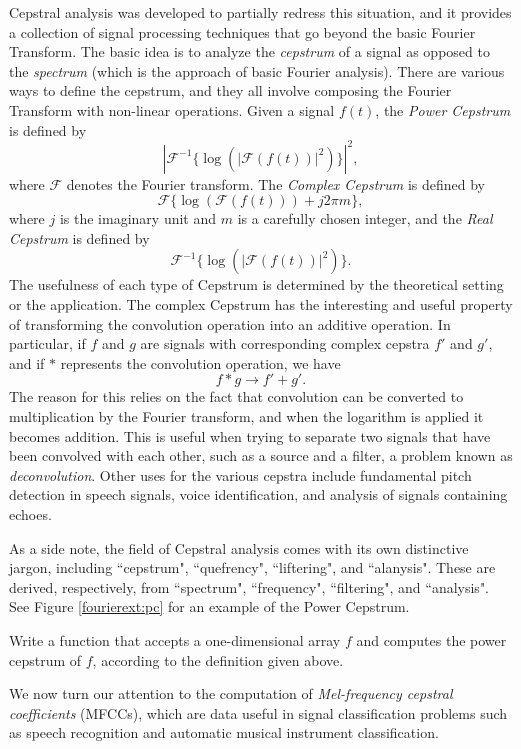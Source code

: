 Cepstral analysis was developed to partially redress this situation, and it provides a collection of signal 
processing techniques that go beyond the basic Fourier Transform. The basic idea is to analyze the
\emph{cepstrum} of a signal as opposed to the \emph{spectrum} (which is the approach of basic Fourier
analysis). There are various ways to define the cepstrum, and they all involve composing the Fourier
Transform with non-linear operations. Given a signal $f(t)$, the \emph{Power Cepstrum} is defined by
$$
\left|\mathcal{F}^{-1}\{\log(|\mathcal{F}(f(t))|^2)\}\right|^2,
$$
where $\mathcal{F}$ denotes the Fourier transform. The \emph{Complex Cepstrum} is defined by
$$
\mathcal{F}\{\log(\mathcal{F}(f(t)))+j2\pi m\},
$$
where $j$ is the imaginary unit and $m$ is a carefully chosen integer, and the \emph{Real Cepstrum}
is defined by
$$
\mathcal{F}^{-1}\{\log(|\mathcal{F}(f(t))|^2)\}.
$$
The usefulness of each type of Cepstrum is determined by the theoretical setting or the application.
The complex Cepstrum has the interesting and useful property of transforming the convolution operation
into an additive operation. In particular, if $f$ and $g$ are signals with corresponding complex
cepstra $f'$ and $g'$, and if $*$ represents the convolution operation, we have
$$
f * g \rightarrow f' + g'.
$$
The reason for this relies on the fact that convolution can be converted to multiplication by
the Fourier transform, and when the logarithm is applied it becomes addition.
This is useful when trying to separate two signals that have been convolved with each other, such as
a source and a filter, a problem known as \emph{deconvolution}.
Other uses for the various cepstra include fundamental pitch detection in speech signals, voice
identification, and analysis of signals containing echoes.

As a side note, the field of Cepstral analysis comes with its own distinctive jargon, including ``cepstrum",
``quefrency", ``liftering", and ``alanysis". These are derived, respectively, from ``spectrum",
``frequency", ``filtering", and ``analysis". See Figure \ref{fourierext:pc} for an example of the Power
Cepstrum.

\begin{problem}
Write a function  that accepts a one-dimensional array $f$ and computes the
power cepstrum of $f$, according to the definition given above.
\end{problem}

We now turn our attention to the computation of \emph{Mel-frequency cepstral coefficients} (MFCCs), which
are data useful in signal classification problems such as
speech recognition and automatic musical instrument classification.


